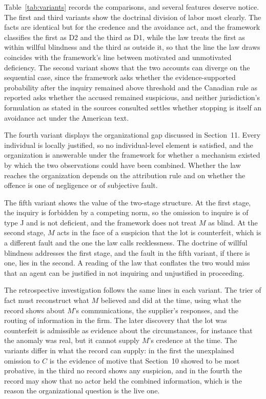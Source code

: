 \documentclass[11pt]{article}
\theoremstyle{plain}
\theoremstyle{definition}
\begin{document}
Table~\ref{tab:variants} records the comparisons, and several features deserve notice. The first and third variants show the doctrinal division of labor most clearly. The facts are identical but for the credence and the avoidance act, and the framework classifies the first as D2 and the third as D1, while the law treats the first as within willful blindness and the third as outside it, so that the line the law draws coincides with the framework's line between motivated and unmotivated deficiency. The second variant shows that the two accounts can diverge on the sequential case, since the framework asks whether the evidence-supported probability after the inquiry remained above threshold and the Canadian rule as reported asks whether the accused remained suspicious, and neither jurisdiction's formulation as stated in the sources consulted settles whether stopping is itself an avoidance act under the American text.

The fourth variant displays the organizational gap discussed in Section~11. Every individual is locally justified, so no individual-level element is satisfied, and the organization is answerable under the framework for whether a mechanism existed by which the two observations could have been combined. Whether the law reaches the organization depends on the attribution rule and on whether the offence is one of negligence or of subjective fault.

The fifth variant shows the value of the two-stage structure. At the first stage, the inquiry is forbidden by a competing norm, so the omission to inquire is of type J and is not deficient, and the framework does not treat $M$ as blind. At the second stage, $M$ acts in the face of a suspicion that the lot is counterfeit, which is a different fault and the one the law calls recklessness. The doctrine of willful blindness addresses the first stage, and the fault in the fifth variant, if there is one, lies in the second. A reading of the law that conflates the two would miss that an agent can be justified in not inquiring and unjustified in proceeding.

The retrospective investigation follows the same lines in each variant. The trier of fact must reconstruct what $M$ believed and did at the time, using what the record shows about $M$'s communications, the supplier's responses, and the routing of information in the firm. The later discovery that the lot was counterfeit is admissible as evidence about the circumstances, for instance that the anomaly was real, but it cannot supply $M$'s credence at the time. The variants differ in what the record can supply: in the first the unexplained omission to $C$ is the evidence of motive that Section~10 showed to be most probative, in the third no record shows any suspicion, and in the fourth the record may show that no actor held the combined information, which is the reason the organizational question is the live one.
\end{document}

